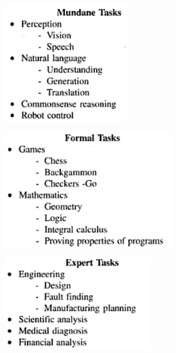 \documentclass{article}
\begin{document}
\begin{figure}[h]
\centering
\begin{minipage}{.33\textwidth}
  \centering
  \includegraphics[width=.75\linewidth]{tareas_mundanas}
  \label{fig:tmundanas}
\end{minipage}%
\begin{minipage}{.33\textwidth}
  \centering
  \includegraphics[width=\linewidth]{tareas_formales}
  \label{fig:tformales}
\end{minipage}
\begin{minipage}{.33\textwidth}
  \centering
  \includegraphics[width=\linewidth]{tareas_expertas}

\end{minipage}
\end{figure}
\end{document}
